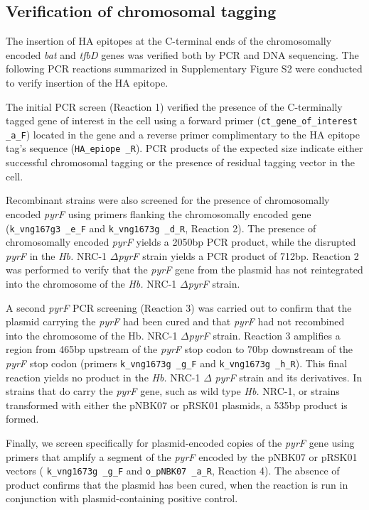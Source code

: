 \subsection{Verification of chromosomal tagging}

The insertion of HA epitopes at the C-terminal ends of the chromosomally encoded {\em bat} and  {\em tfbD}  genes was verified both by PCR and DNA sequencing. The following PCR reactions summarized in Supplementary Figure S2 were conducted to verify insertion of the HA epitope.

The initial PCR screen (Reaction 1) verified the presence of the C-terminally tagged gene of interest in the cell using a forward primer ({\tt ct\_gene\_of\_interest \_a\_F}) located in the gene and a reverse primer complimentary to the HA epitope tag's sequence ({\tt HA\_epiope \_R}). PCR products of the expected size indicate either successful chromosomal tagging or the presence of residual tagging vector in the cell.

Recombinant strains were also screened for the presence of chromosomally encoded  {\em pyrF}  using primers flanking the chromosomally encoded gene ({\tt k\_vng167g3 \_e\_F} and {\tt k\_vng1673g \_d\_R}, Reaction 2). The presence of chromosomally encoded  {\em pyrF}  yields a 2050bp PCR product, while the disrupted  {\em pyrF}  in the {\em Hb.} NRC-1 $\Delta${\em pyrF}  strain yields a PCR product of 712bp. Reaction 2 was performed to verify that the  {\em pyrF}  gene from the plasmid has not reintegrated into the chromosome of the {\em Hb.} NRC-1 $\Delta${\em pyrF} strain.

A second  {\em pyrF}  PCR screening (Reaction 3) was carried out to confirm that the plasmid carrying the  {\em pyrF}  had been cured and that {\em pyrF} had not recombined into the chromosome of the Hb. NRC-1 $\Delta${\em pyrF}  strain. Reaction 3 amplifies a region from 465bp upstream of the {\em pyrF} stop codon to 70bp downstream of the  {\em pyrF}  stop codon (primers {\tt k\_vng1673g \_g\_F} and {\tt k\_vng1673g \_h\_R}). This final reaction yields no product in the {\em Hb.} NRC-1 $\Delta$  {\em pyrF}  strain and its derivatives. In strains that do carry the  {\em pyrF}  gene, such as wild type {\em Hb.} NRC-1, or strains transformed with either the pNBK07 or pRSK01 plasmids, a 535bp product is formed.

Finally, we screen specifically for plasmid-encoded copies of the {\em pyrF} gene using primers that amplify a segment of the  {\em pyrF}  encoded by the pNBK07 or pRSK01 vectors ( {\tt k\_vng1673g \_g\_F} and {\tt o\_pNBK07 \_a\_R}, Reaction 4). The absence of product confirms that the plasmid has been cured, when the reaction is run in conjunction with plasmid-containing positive control.

